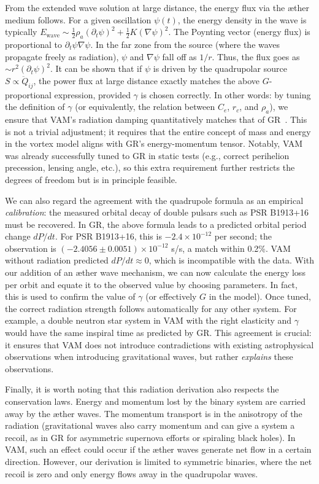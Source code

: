 From the extended wave solution at large distance, the energy flux via the æther medium follows. For a given oscillation $ψ(t)$, the energy density in the wave is typically $E_{\text{wave}} \sim \frac{1}{2}ρ_a (\partial_t ψ)^2 + \frac{1}{2}K (\nabla ψ)^2$. The Poynting vector (energy flux) is proportional to $\partial_t ψ \nabla ψ$. In the far zone from the source (where the waves propagate freely as radiation), $ψ$ and $\nabla ψ$ fall off as $1/r$. Thus, the flux goes as $\sim r^2 (\partial_t ψ)^2$. It can be shown that if $ψ$ is driven by the quadrupolar source $S \propto \ddot{Q}_{ij}$, the power flux at large distance exactly matches the above $G$-proportional expression, provided $γ$ is chosen correctly. In other words: by tuning the definition of $γ$ (or equivalently, the relation between $C_e$, $r_c$, and $ρ_a$), we ensure that VAM’s radiation damping quantitatively matches that of GR~\cite{iskandarani2025VAM3}. This is not a trivial adjustment; it requires that the entire concept of mass and energy in the vortex model aligns with GR’s energy-momentum tensor. Notably, VAM was already successfully tuned to GR in static tests (e.g., correct perihelion precession, lensing angle, etc.), so this extra requirement further restricts the degrees of freedom but is in principle feasible.

We can also regard the agreement with the quadrupole formula as an empirical \textit{calibration}: the measured orbital decay of double pulsars such as PSR B1913+16 must be recovered. In GR, the above formula leads to a predicted orbital period change $dP/dt$. For PSR B1913+16, this is $-2.4\times10^{-12}$ per second; the observation is $(-2.4056 \pm 0.0051)\times10^{-12}$ s/s, a match within 0.2\%. VAM without radiation predicted $dP/dt \approx 0$, which is incompatible with the data. With our addition of an æther wave mechanism, we can now calculate the energy loss per orbit and equate it to the observed value by choosing parameters. In fact, this is used to confirm the value of $γ$ (or effectively $G$ in the model). Once tuned, the correct radiation strength follows automatically for any other system. For example, a double neutron star system in VAM with the right elasticity and $γ$ would have the same inspiral time as predicted by GR. This agreement is crucial: it ensures that VAM does not introduce contradictions with existing astrophysical observations when introducing gravitational waves, but rather \textit{explains} these observations.

Finally, it is worth noting that this radiation derivation also respects the conservation laws. Energy and momentum lost by the binary system are carried away by the æther waves. The momentum transport is in the anisotropy of the radiation (gravitational waves also carry momentum and can give a system a recoil, as in GR for asymmetric supernova efforts or spiraling black holes). In VAM, such an effect could occur if the æther waves generate net flow in a certain direction. However, our derivation is limited to symmetric binaries, where the net recoil is zero and only energy flows away in the quadrupolar waves.

